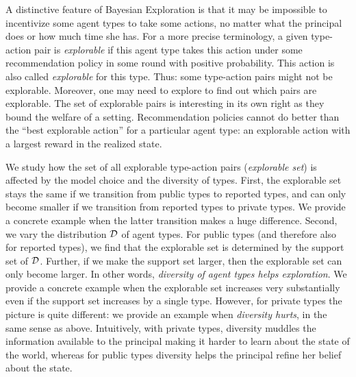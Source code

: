 A distinctive feature of Bayesian Exploration is that it may be impossible to incentivize some agent types to take some actions, no matter what the principal does or how much time she has. For a more precise terminology, a given type-action pair is \emph{explorable} if this agent type takes this action under some recommendation policy in some round with positive probability. This action is also called \emph{explorable} for this type. Thus: some type-action pairs might not be explorable. Moreover, one may need to explore to find out which pairs are explorable.  The set of explorable pairs is interesting in its own right as they bound the welfare of a setting. Recommendation policies cannot do better than the ``best explorable action'' for a particular agent type: an explorable action with a largest reward in the realized state.

We study how the set of all explorable type-action pairs (\emph{explorable set}) is affected by the model choice and the diversity of types. First,  the explorable set stays the same if we transition from public types to reported types, and can only become smaller if we transition from reported types to private types.
We provide a concrete example when the latter transition makes a huge difference. Second, we vary the distribution $\mathcal{D}$ of agent types. For public types (and therefore also for reported types), we find that the explorable set is determined by the support set of $\mathcal{D}$. Further, if we make the support set larger, then the explorable set can only become larger. In other words, \emph{diversity of agent types helps exploration}. We provide a concrete example when the explorable set increases very substantially even if the support set increases by a single type. However, for private types the picture is quite different: we provide an example when \emph{diversity hurts}, in the same sense as above. Intuitively, with private types, diversity muddles the information available to the principal making it harder to learn about the state of the world, whereas for public types diversity helps the principal refine her belief about the state.

